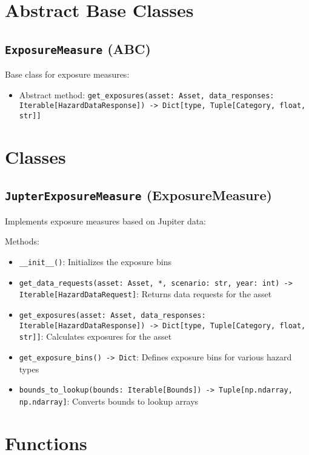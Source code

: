 \documentclass{article}
\begin{document}
\section{Abstract Base Classes}

\subsection{\texttt{ExposureMeasure} (ABC)}
Base class for exposure measures:
\begin{itemize}
    \item Abstract method: \texttt{get\_exposures(asset: Asset, data\_responses: Iterable[HazardDataResponse]) -> Dict[type, Tuple[Category, float, str]]}
\end{itemize}

\section{Classes}

\subsection{\texttt{JupterExposureMeasure} (ExposureMeasure)}
Implements exposure measures based on Jupiter data:

Methods:
\begin{itemize}
    \item \texttt{\_\_init\_\_()}: Initializes the exposure bins
    \item \texttt{get\_data\_requests(asset: Asset, *, scenario: str, year: int) -> Iterable[HazardDataRequest]}: Returns data requests for the asset
    \item \texttt{get\_exposures(asset: Asset, data\_responses: Iterable[HazardDataResponse]) -> Dict[type, Tuple[Category, float, str]]}: Calculates exposures for the asset
    \item \texttt{get\_exposure\_bins() -> Dict}: Defines exposure bins for various hazard types
    \item \texttt{bounds\_to\_lookup(bounds: Iterable[Bounds]) -> Tuple[np.ndarray, np.ndarray]}: Converts bounds to lookup arrays
\end{itemize}

\section{Functions}
\end{document}
